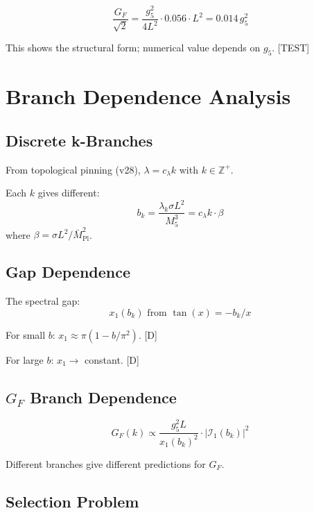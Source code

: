 \documentclass[11pt,a4paper]{article}
\newcommand{\Mpl}{\bar{M}_{\mathrm{Pl}}}
\begin{document}
\begin{equation}
\frac{G_F}{\sqrt{2}} = \frac{g_5^2}{4L^2} \cdot 0.056 \cdot L^2 = 0.014 \, g_5^2
\label{eq:toy-gf}
\end{equation}

This shows the structural form; numerical value depends on $g_5$. [TEST]

\section{Branch Dependence Analysis}
\label{app:branches}

\subsection{Discrete k-Branches}

From topological pinning (v28), $\lambda = c_\lambda k$ with $k \in \mathbb{Z}^+$.

Each $k$ gives different:
\begin{equation}
b_k = \frac{\lambda_k \sigma L^2}{M_5^3} = c_\lambda k \cdot \beta
\label{eq:b-branch}
\end{equation}
where $\beta = \sigma L^2/\Mpl^2$.

\subsection{Gap Dependence}

The spectral gap:
\begin{equation}
x_1(b_k) \text{ from } \tan(x) = -b_k/x
\label{eq:gap-branch}
\end{equation}

For small $b$: $x_1 \approx \pi(1 - b/\pi^2)$. [D]

For large $b$: $x_1 \to$ constant. [D]

\subsection{$G_F$ Branch Dependence}

\begin{equation}
G_F(k) \propto \frac{g_5^2 L}{x_1(b_k)^2} \cdot |\mathcal{I}_1(b_k)|^2
\label{eq:gf-branch}
\end{equation}

Different branches give different predictions for $G_F$.

\subsection{Selection Problem}
\end{document}
